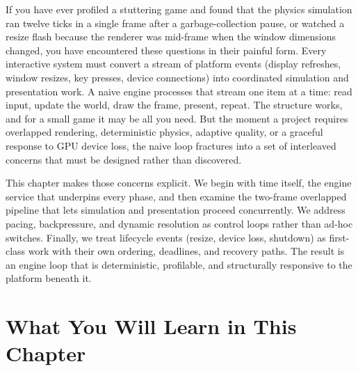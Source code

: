 \documentclass[
  11pt,
  letterpaper,
  DIV=11,
  numbers=noendperiod,
  twoside,
  open=right]{scrreprt}
\begin{document}
If you have ever profiled a stuttering game and found that the physics
simulation ran twelve ticks in a single frame after a garbage-collection
pause, or watched a resize flash because the renderer was mid-frame when
the window dimensions changed, you have encountered these questions in
their painful form. Every interactive system must convert a stream of
platform events (display refreshes, window resizes, key presses, device
connections) into coordinated simulation and presentation work. A naive
engine processes that stream one item at a time: read input, update the
world, draw the frame, present, repeat. The structure works, and for a
small game it may be all you need. But the moment a project requires
overlapped rendering, deterministic physics, adaptive quality, or a
graceful response to GPU device loss, the naive loop fractures into a
set of interleaved concerns that must be designed rather than
discovered.

This chapter makes those concerns explicit. We begin with time itself,
the engine service that underpins every phase, and then examine the
two-frame overlapped pipeline that lets simulation and presentation
proceed concurrently. We address pacing, backpressure, and dynamic
resolution as control loops rather than ad-hoc switches. Finally, we
treat lifecycle events (resize, device loss, shutdown) as first-class
work with their own ordering, deadlines, and recovery paths. The result
is an engine loop that is deterministic, profilable, and structurally
responsive to the platform beneath it.

\section*{What You Will Learn in This
Chapter}\label{what-you-will-learn-in-this-chapter-3}

\end{document}
